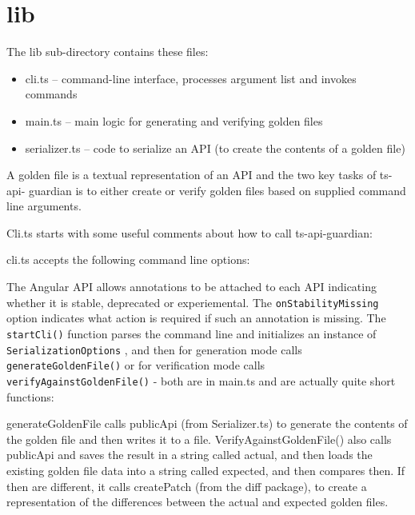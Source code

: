 \section{lib}

The lib sub-directory contains these files:

\begin{itemize}
  \item cli.ts – command-line interface, processes argument list and invokes commands
  \item main.ts – main logic for generating and verifying golden files
  \item serializer.ts – code to serialize an API (to create the contents of a golden file)
\end{itemize}

A golden file is a textual representation of an API and the two key tasks of ts-api-
guardian is to either create or verify golden files based on supplied command line
arguments.

Cli.ts starts with some useful comments about how to call ts-api-guardian:



cli.ts accepts the following command line options:



The Angular API allows annotations to be attached to each API indicating whether it is
stable, deprecated or experiemental. The
\texttt{onStabilityMissing}
option indicates what
action is required if such an annotation is missing. The
\texttt{startCli()}
function parses
the command line and initializes an instance of
\texttt{SerializationOptions}
, and then for
generation mode calls
\texttt{generateGoldenFile()}
or for verification mode calls
\texttt{verifyAgainstGoldenFile()}
- both are in main.ts and are actually quite short
functions:



generateGoldenFile calls publicApi (from Serializer.ts) to generate the contents of the
golden file and then writes it to a file.  VerifyAgainstGoldenFile() also calls publicApi
and saves the result in a string called actual, and then loads the existing golden file
data into a string called expected, and then compares then. If then are different, it
calls createPatch (from the diff package), to create a representation of the differences
between the actual and expected golden files.

